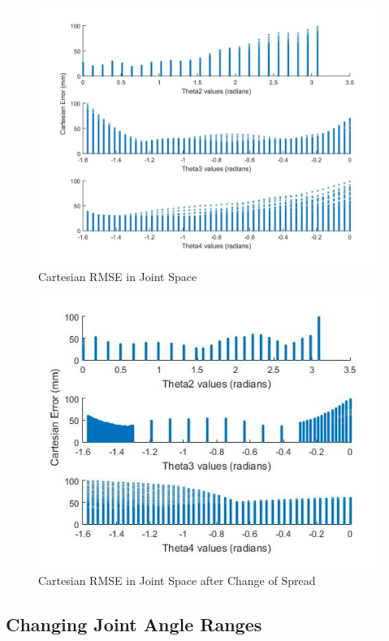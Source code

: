 \documentclass[11.5pt, twoside, a4paper]{article}
\begin{document}
\begin{figure}
\includegraphics[width=\linewidth]{cartesianerrorsTHETA.jpg}
\caption{Cartesian RMSE in Joint Space\label{fig:carterrors}}
\end{figure}

\begin{figure}
\includegraphics[width=\linewidth]{spreadChange.jpg}
\caption{Cartesian RMSE in Joint Space after Change of Spread\label{fig:spread}}
\end{figure}

\subsection{Changing Joint Angle Ranges} %
\end{document}
